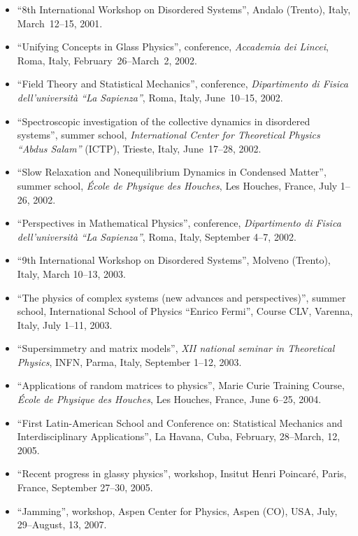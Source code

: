 \documentclass[a4paper,10pt]{article}
\begin{document}
\vskip-10pt
\begin{itemize}
\item ``8th International Workshop on Disordered Systems'', Andalo (Trento), 
Italy, March~12--15, 2001.
\item ``Unifying Concepts in Glass Physics'', conference, {\it Accademia dei Lincei},
Roma, Italy, February~26--March~2, 2002.
\item ``Field Theory and Statistical Mechanics'', 
conference, {\it Dipartimento di Fisica dell'universit\`a ``La Sapienza''}, Roma, Italy,
June~10--15, 2002.
\item ``Spectroscopic investigation of the collective dynamics in disordered systems'', 
summer school, {\it International Center for Theoretical Physics ``Abdus Salam''} (ICTP), Trieste,
Italy, June~17--28, 2002.
\item ``Slow Relaxation and Nonequilibrium Dynamics in Condensed Matter'',
summer school, {\it \'Ecole de Physique des Houches}, Les Houches, France, July 1--26, 2002.
\item ``Perspectives in Mathematical Physics'', conference, 
{\it Dipartimento di Fisica dell'universit\`a ``La Sapienza''}, Roma, Italy,
September 4--7, 2002.
\item ``9th International Workshop on Disordered Systems'', Molveno (Trento), Italy, 
March 10--13, 2003.
\item ``The physics of complex systems (new advances and perspectives)'', summer school,
International School of Physics ``Enrico Fermi'', Course CLV, Varenna, Italy, 
July 1--11, 2003.
\item ``Supersimmetry and matrix models'',
{\it XII national seminar in Theoretical Physics}, INFN, Parma, Italy, 
September 1--12, 2003.
\item ``Applications of random matrices to physics'', 
Marie Curie Training Course, {\it \'Ecole de Physique des Houches}, 
Les Houches, France, June 6--25, 2004.
\item ``First Latin-American School and Conference on: Statistical Mechanics and Interdisciplinary Applications'', 
La Havana, Cuba, February, 28--March, 12, 2005.
\item ``Recent progress in glassy physics'', workshop,
Insitut Henri Poincar\'e, Paris, France, September 27--30, 2005.
\item ``Jamming'', workshop,
Aspen Center for Physics, Aspen (CO), USA, July, 29--August, 13, 2007.
\end{itemize}
\end{document}
